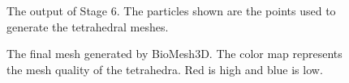 \documentclass[fleqn,12pt,openany]{book}
\begin{document}
\begin{figure}
\begin{center}
\end{center}
\caption{\label{fig:tooth_stage4} The output of Stage 6.  The particles shown are the points used to generate the tetrahedral meshes.}
\end{figure} 

\begin{figure}
\begin{center}
\end{center}
\caption{\label{fig:tooth_stage5} The final mesh generated by BioMesh3D.  The color map represents the mesh quality of the tetrahedra.  Red is high and blue is low.}
\end{figure} 
\end{document}

